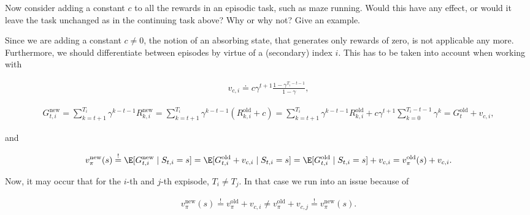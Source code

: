 
\begin{exercise}[Exercise 3.16]

Now consider adding a constant $c$ to all the rewards in an episodic task, such as maze running.
Would this have any effect, or would it leave the task unchanged as in the continuing task above?
Why or why not?
Give an example.    

\end{exercise}


\begin{solution}

Since we are adding a constant $c \neq 0$, the notion of an absorbing state, that generates only rewards of zero, is not applicable any more.
Furthermore, we should differentiate between episodes by virtue of a (secondary) index $i$.
This has to be taken into account when working with

\begin{align*}
    v_{c, i} \doteq c \gamma^{t+1} \frac{1 - \gamma^{T_i - t - 1}}{1 - \gamma},
\end{align*}

\begin{align*}
    G_{t, i}^\text{new}
    =
    \sum_{k=t+1}^{T_i}
        \gamma^{k-t-1} R_{k, i}^\text{new}
    =
    \sum_{k=t+1}^{T_i}
        \gamma^{k-t-1} (R_{k, i}^\text{old} + c)
    =
    \sum_{k=t+1}^{T_i}
        \gamma^{k-t-1} R_{k, i}^\text{old}
    +
    c \gamma^{t+1}
    \sum_{k=0}^{T_i - t - 1}
        \gamma^k
    =
    G_t^\text{old} + v_{c, i},
\end{align*}

and

\begin{align*}
    v_\pi^\text{new}(s)
    \stackrel{!}{=}
    \E[G_{t, i}^\text{new} \mid S_{t, i} = s]
    =
    \E[G_{t, i}^\text{old} + v_{c, i} \mid S_{t, i} = s]
    =
    \E[G_{t, i}^\text{old} \mid S_{t, i} = s] + v_{c, i}
    =
    v_\pi^\text{old}(s) + v_{c, i}.
\end{align*}

Now, it may occur that for the $i$-th and $j$-th expisode, $T_i \neq T_j$.
In that case we run into an issue because of

\begin{align*}
    v_\pi^\text{new}(s)
    \stackrel{!}{=}
    v_\pi^\text{old} + v_{c, i}
    \neq
    v_\pi^\text{old} + v_{c, j}
    \stackrel{!}{=}
    v_\pi^\text{new}(s).
\end{align*}

\end{solution}

